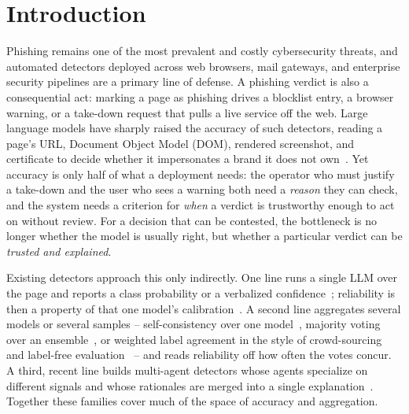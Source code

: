 \section{Introduction}
\label{sec:intro}

Phishing remains one of the most prevalent and costly cybersecurity threats, and
automated detectors deployed across web browsers, mail gateways, and enterprise
security pipelines are a primary line of defense. A phishing verdict is also a consequential
act: marking a page as phishing drives a blocklist entry, a browser warning, or a
take-down request that pulls a live service off the web. Large language models have sharply raised the accuracy of
such detectors, reading a page's URL, Document Object Model (DOM), rendered screenshot, and certificate
to decide whether it impersonates a brand it does not own~\cite{tan2024phishllm,
li2024knowphish}. Yet accuracy is only half of what a deployment needs: the
operator who must justify a take-down and the user who sees a warning both need a
\emph{reason} they can check, and the system needs a criterion for \emph{when} a
verdict is trustworthy enough to act on without review. For a decision that can be
contested, the bottleneck is no longer whether the model is usually right, but
whether a particular verdict can be \emph{trusted and explained}.

Existing detectors approach this only indirectly. One line runs a single LLM over
the page and reports a class probability or a verbalized
confidence~\cite{tan2024phishllm}; reliability is then a property of that one
model's calibration~\cite{guo2017calibration}. A second line aggregates several
models or several samples -- self-consistency over one
model~\cite{wang2023selfconsistency}, majority voting over an
ensemble~\cite{ensembleornot2024}, or weighted label agreement in the style of
crowd-sourcing and label-free evaluation~\cite{dawid1979maximum,tci2025} -- and
reads reliability off how often the votes concur. A third, recent line builds
multi-agent detectors whose agents specialize on different signals and whose
rationales are merged into a single explanation~\cite{phishdebate2025,
multiphishguard2025}. Together these families cover much of the space of accuracy
and aggregation.

